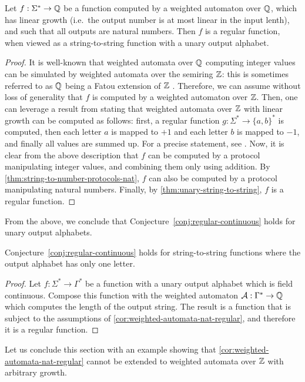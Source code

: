 \begin{corollary}
  \label{cor:weighted-automata-nat-regular}
  Let $f : \Sigma^* \to {\mathbb Q}$ be a function computed by a weighted automaton
  over  ${\mathbb Q}$, which has linear growth (i.e.~the output number is at most linear in the input lenth), and such that all outputs are natural numbers. Then $f$ is a regular function, when viewed as a string-to-string function with a unary output alphabet.
\end{corollary}
\begin{proof}
  It is well-known that weighted automata over ${\mathbb Q}$ computing integer values
  can be simulated by weighted automata over the semiring ${\mathbb Z}$: this is
  sometimes referred to as ${\mathbb Q}$ being a Fatou extension of ${\mathbb Z}$
  \cite[p. 110]{BerstelReutenauer08}.
  Therefore, we can assume without loss of generality that $f$ is computed by
  a weighted automaton over ${\mathbb Z}$. Then, one can leverage a 
  result from \cite{Zpolyreg23} stating that weighted automata over ${\mathbb Z}$
  with linear growth can be computed as follows: first, a regular function $g : \Sigma^* \to
  \{a,b\}^*$ is computed, then each letter $a$ is mapped to $+1$ and each 
  letter $b$ is mapped to $-1$, and finally all values are summed up. 
  For a precise statement, see \cite[Proposition II.13, Theorem III.3]{Zpolyreg23}.
  Now, it is clear from the above description that $f$ can be computed by a protocol
  manipulating integer values, and combining them only using addition. By
  \cref{thm:string-to-number-protocols-nat}, $f$ can also be computed by a
  protocol manipulating natural numbers. Finally, by \cref{thm:unary-string-to-string},
  $f$ is a regular function.
\end{proof}

From the above, we conclude that Conjecture~\ref{conj:regular-continuous} holds for unary output alphabets.
\begin{corollary}
  \label{cor:regular-continuous-unary}
  Conjecture~\ref{conj:regular-continuous} holds for string-to-string functions where the output alphabet has only one letter.
\end{corollary}
\begin{proof}
  Let $f : \Sigma^* \to \Gamma^*$ be a function with a unary output alphabet which is field continuous. Compose this function with the weighted automaton ${\mathcal A} : \Gamma^* \to {\mathbb Q}$ which computes the length of the output string. The result is a function that is subject to the assumptions of \cref{cor:weighted-automata-nat-regular}, and therefore it is a regular function. 
\end{proof}
Let us conclude this section with an example showing that
\cref{cor:weighted-automata-nat-regular} cannot be extended to weighted
automata over ${\mathbb Z}$ with arbitrary growth.

